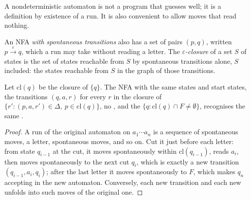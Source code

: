 A nondeterministic automaton is not a program that guesses well; it is a definition by existence of a run. It is
also convenient to allow moves that read nothing.

\begin{definition}\label{def:b2:finite-automata:epsilon}
An NFA \emph{with spontaneous transitions} also has a set of pairs $(p, q)$, written $p \xrightarrow{\varepsilon}
q$, which a run may take without reading a letter. The
\emph{$\varepsilon$-closure} of a set $S$ of states is the set of states
reachable from $S$ by spontaneous transitions alone, $S$ included: the states reachable from $S$ in the graph of
those transitions.
\end{definition}

\label{lst:b2:finite-automata:closure}

\begin{proposition}\label{prop:b2:finite-automata:epsilon}
Let $\mathrm{cl}(q)$ be the closure of $\{q\}$. The NFA with the same states and start states, the transitions $(q, a,
r)$ for every $r$ in the closure of $\{r' : (p, a, r') \in \Delta,\ p \in \mathrm{cl}(q)\}$, no , and the  $\{q : \mathrm{cl}(q) \cap F \ne \emptyset\}$, recognises the same .
\end{proposition}

\begin{proof}
A run of the original automaton on $a_1 \cdots a_n$ is a sequence of spontaneous moves, a letter, spontaneous moves,
and so on. Cut it just before each letter: from state $q_{i-1}$ at the cut, it moves spontaneously within
$\mathrm{cl}(q_{i-1})$, reads $a_i$, then moves spontaneously to the next cut $q_i$, which is exactly a new transition
$(q_{i-1}, a_i, q_i)$; after the last letter it moves spontaneously to $F$, which makes $q_n$ accepting in the new
automaton. Conversely, each new transition and each new  unfolds into such moves of the original
one.
\end{proof}

\label{out:b2:finite-automata:epsilon}


